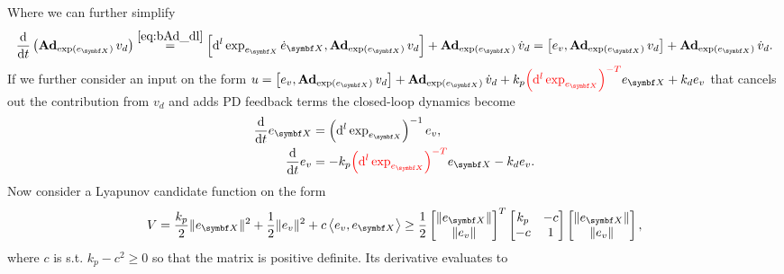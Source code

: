 Where we can further simplify
\begin{equation}
  \frac{\mathrm{d}}{\mathrm{d}t} \left( \bAd_{\exp(e_\X)} v_d\right) \overset{\eqref{eq:bAd_dl}}= \left[ \mathrm{d}^l \exp_{e_\X} \dot e_\X,  \bAd_{\exp(e_\X)} v_d \right] + \bAd_{\exp(e_\X)} \dot v_d = \left[ e_v,  \bAd_{\exp(e_\X)} v_d \right] + \bAd_{\exp(e_\X)} \dot v_d.
\end{equation}
If we further consider an input on the form $u = \left[ e_v,  \bAd_{\exp(e_\X)} v_d \right] + \bAd_{\exp(e_\X)} \dot v_d + k_p \textcolor{red}{\left( \mathrm{d}^l \exp_{e_\X} \right)^{-T}} e_\X + k_d e_v$ that cancels out the contribution from $v_d$ and adds PD feedback terms the closed-loop dynamics become
\begin{equation}
  \begin{aligned}
    \frac{\mathrm{d}}{\mathrm{d}t} e_\X & = \left(\mathrm{d}^l \exp_{e_\X} \right)^{-1} e_v,                                   \\
    \frac{\mathrm{d}}{\mathrm{d}t} e_v  & = -k_p \textcolor{red}{\left( \mathrm{d}^l \exp_{e_\X} \right)^{-T}} e_\X - k_d e_v.
  \end{aligned}
\end{equation}
Now consider a Lyapunov candidate function on the form
\begin{equation}
  V = \frac{k_p}{2} \| e_\X \|^2 + \frac{1}{2} \| e_v \|^2 + c \left \langle e_v, e_\X \right \rangle \geq \frac{1}{2} \begin{bmatrix} \| e_\X \| \\ \| e_v \| \end{bmatrix}^T \begin{bmatrix} k_p & -c \\ -c & 1 \end{bmatrix} \begin{bmatrix} \| e_\X \| \\ \| e_v \| \end{bmatrix},
\end{equation}
where $c$ is s.t. $k_p - c^2 \geq 0$ so that the matrix is positive definite. Its derivative evaluates to
